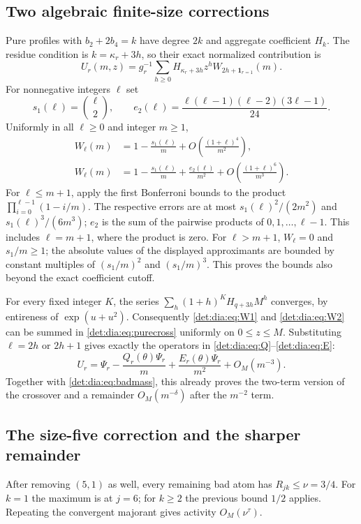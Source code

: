 \documentclass[11pt,letterpaper]{article}
\numberwithin{equation}{section}
\theoremstyle{definition}\newtheorem{definition}[theorem]{Definition}
\theoremstyle{remark}\newtheorem{remark}[theorem]{Remark}
\begin{document}
\subsection{Two algebraic finite-size corrections}
Pure profiles with $b_2+2b_4=k$ have degree $2k$ and aggregate coefficient
$H_k$. The residue condition is $k=\kappa_r+3h$, so their exact normalized
contribution is
\begin{equation}\label{det:dia:eq:purecross}
 U_r(m,z)=g_r^{-1}\sum_{h\geq0}H_{\kappa_r+3h}z^h
 W_{2h+\mathbf1_{r=1}}(m).
\end{equation}
For nonnegative integers $\ell$ set
\[
 s_1(\ell)=\binom\ell2,\qquad
 e_2(\ell)=\frac{\ell(\ell-1)(\ell-2)(3\ell-1)}{24}.
\]
Uniformly in all $\ell\geq0$ and integer $m\geq1$,
\begin{align}
 W_\ell(m)&=1-\frac{s_1(\ell)}m
 +O\left(\frac{(1+\ell)^4}{m^2}\right),\label{det:dia:eq:W1}\\
 W_\ell(m)&=1-\frac{s_1(\ell)}m+\frac{e_2(\ell)}{m^2}
 +O\left(\frac{(1+\ell)^6}{m^3}\right).\label{det:dia:eq:W2}
\end{align}
For $\ell\leq m+1$, apply the first Bonferroni bounds to the product
$\prod_{i=0}^{\ell-1}(1-i/m)$. The respective errors are at most
$s_1(\ell)^2/(2m^2)$ and $s_1(\ell)^3/(6m^3)$; $e_2$ is the sum
of the pairwise products of $0,1,\ldots,\ell-1$. This includes
$\ell=m+1$, where the product is zero. For $\ell>m+1$, $W_\ell=0$
and $s_1/m\geq1$; the absolute values of the displayed approximants
are bounded by constant multiples of $(s_1/m)^2$ and $(s_1/m)^3$.
This proves the bounds also beyond the exact coefficient cutoff.

For every fixed integer $K$, the series
$\sum_h(1+h)^K H_{q+3h}M^h$ converges, by entireness of
$\exp(u+u^2)$. Consequently \eqref{det:dia:eq:W1} and \eqref{det:dia:eq:W2} can be
summed in \eqref{det:dia:eq:purecross} uniformly on $0\leq z\leq M$.
Substituting $\ell=2h$ or $2h+1$ gives exactly the operators in
\eqref{det:dia:eq:Q}--\eqref{det:dia:eq:E}:
\begin{equation}\label{det:dia:eq:pureexpansion}
 U_r=\Psi_r-\frac{Q_r(\theta)\Psi_r}{m}
 +\frac{E_r(\theta)\Psi_r}{m^2}+O_M(m^{-3}).
\end{equation}
Together with \eqref{det:dia:eq:badmass}, this already proves the two-term
version of the crossover and a remainder $O_M(m^{-\delta})$ after
the $m^{-2}$ term.

\subsection{The size-five correction and the sharper remainder}
After removing $(5,1)$ as well, every remaining bad atom has
$R_{jk}\leq\nu=3/4$. For $k=1$ the maximum is at $j=6$; for
$k\geq2$ the previous bound $1/2$ applies. Repeating the convergent
majorant gives activity $O_M(\nu^\tau)$.
\end{document}
